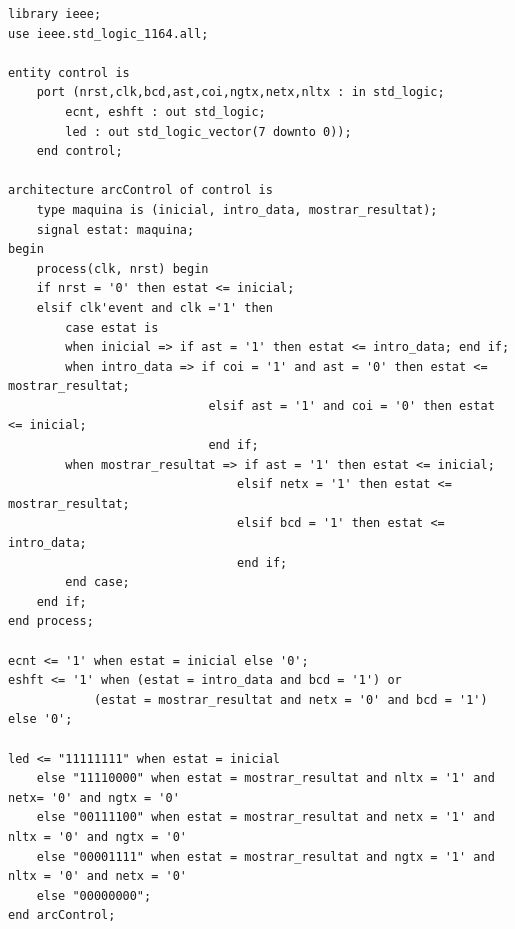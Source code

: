 \documentclass[12pt, a4papre]{article}
\begin{document}
\begin{lstlisting}[style=vhdl, frame=single, basicstyle=\tiny]
		library ieee;
use ieee.std_logic_1164.all;

entity control is
	port (nrst,clk,bcd,ast,coi,ngtx,netx,nltx : in std_logic;
		ecnt, eshft : out std_logic;
		led : out std_logic_vector(7 downto 0));
	end control;

architecture arcControl of control is 
	type maquina is (inicial, intro_data, mostrar_resultat);
	signal estat: maquina;
begin
	process(clk, nrst) begin
	if nrst = '0' then estat <= inicial;
	elsif clk'event and clk ='1' then
		case estat is 
		when inicial => if ast = '1' then estat <= intro_data; end if;
		when intro_data => if coi = '1' and ast = '0' then estat <= mostrar_resultat;
							elsif ast = '1' and coi = '0' then estat <= inicial;
							end if;
		when mostrar_resultat => if ast = '1' then estat <= inicial;
								elsif netx = '1' then estat <= mostrar_resultat;
								elsif bcd = '1' then estat <= intro_data;
								end if;
		end case;
	end if;
end process;

ecnt <= '1' when estat = inicial else '0';
eshft <= '1' when (estat = intro_data and bcd = '1') or
			(estat = mostrar_resultat and netx = '0' and bcd = '1') else '0';
			
led <= "11111111" when estat = inicial 
    else "11110000" when estat = mostrar_resultat and nltx = '1' and netx= '0' and ngtx = '0'
	else "00111100" when estat = mostrar_resultat and netx = '1' and nltx = '0' and ngtx = '0'
	else "00001111" when estat = mostrar_resultat and ngtx = '1' and nltx = '0' and netx = '0'
	else "00000000";
end arcControl;
		
		
		\end{lstlisting}
		
		
	
\end{document}
